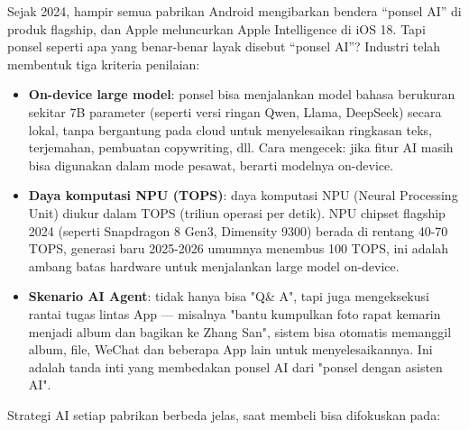


Sejak 2024, hampir semua pabrikan Android mengibarkan bendera “ponsel AI” di produk flagship, dan Apple meluncurkan Apple Intelligence di iOS 18. Tapi ponsel seperti apa yang benar-benar layak disebut “ponsel AI”? Industri telah membentuk tiga kriteria penilaian:

\begin{itemize}
  \item \textbf{On-device large model}: ponsel bisa menjalankan model bahasa berukuran sekitar 7B parameter (seperti versi ringan Qwen, Llama, DeepSeek) secara lokal, tanpa bergantung pada cloud untuk menyelesaikan ringkasan teks, terjemahan, pembuatan copywriting, dll. Cara mengecek: jika fitur AI masih bisa digunakan dalam mode pesawat, berarti modelnya on-device.
  \item \textbf{Daya komputasi NPU (TOPS)}: daya komputasi NPU (Neural Processing Unit) diukur dalam TOPS (triliun operasi per detik). NPU chipset flagship 2024 (seperti Snapdragon 8 Gen3, Dimensity 9300) berada di rentang 40-70 TOPS, generasi baru 2025-2026 umumnya menembus 100 TOPS, ini adalah ambang batas hardware untuk menjalankan large model on-device.
  \item \textbf{Skenario AI Agent}: tidak hanya bisa "Q\& A", tapi juga mengeksekusi rantai tugas lintas App — misalnya "bantu kumpulkan foto rapat kemarin menjadi album dan bagikan ke Zhang San", sistem bisa otomatis memanggil album, file, WeChat dan beberapa App lain untuk menyelesaikannya. Ini adalah tanda inti yang membedakan ponsel AI dari "ponsel dengan asisten AI".
\end{itemize}


Strategi AI setiap pabrikan berbeda jelas, saat membeli bisa difokuskan pada:

